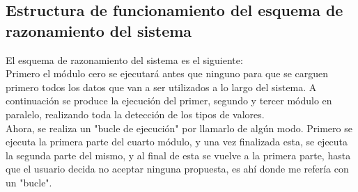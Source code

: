 \subsection{Estructura de funcionamiento del esquema de razonamiento del sistema}
El esquema de razonamiento del sistema es el siguiente:\\
Primero el módulo cero se ejecutará antes que ninguno para que se carguen primero todos los datos que van a ser utilizados a lo largo del sistema. A continuación se produce la ejecución del primer, segundo y tercer módulo en paralelo, realizando toda la detección de los tipos de valores.\\
Ahora, se realiza un "bucle de ejecución" por llamarlo de algún modo. Primero se ejecuta la primera parte del cuarto módulo, y una vez finalizada esta, se ejecuta la segunda parte del mismo, y al final de esta se vuelve a la primera parte, hasta que el usuario decida no aceptar ninguna propuesta, es ahí donde me refería con un "bucle".
